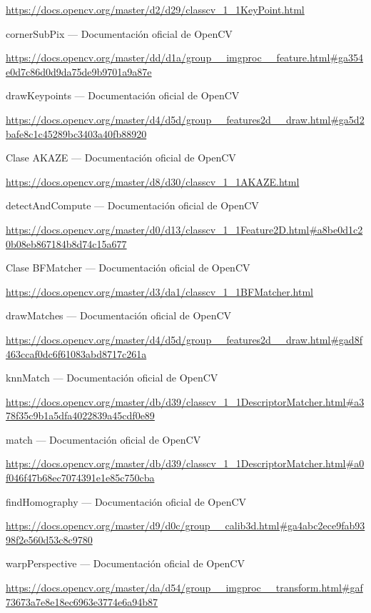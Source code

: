 \documentclass[12pt, spanish]{article}
\begin{document}
\begin{thebibliography}{9}
		\url{https://docs.opencv.org/master/d2/d29/classcv_1_1KeyPoint.html}


		cornerSubPix --- Documentación oficial de OpenCV

		\url{https://docs.opencv.org/master/dd/d1a/group__imgproc__feature.html#ga354e0d7c86d0d9da75de9b9701a9a87e}


		drawKeypoints --- Documentación oficial de OpenCV

		\url{https://docs.opencv.org/master/d4/d5d/group__features2d__draw.html#ga5d2bafe8c1c45289bc3403a40fb88920}


		Clase AKAZE --- Documentación oficial de OpenCV

		\url{https://docs.opencv.org/master/d8/d30/classcv_1_1AKAZE.html}


		detectAndCompute --- Documentación oficial de OpenCV

		\url{https://docs.opencv.org/master/d0/d13/classcv_1_1Feature2D.html#a8be0d1c20b08eb867184b8d74c15a677}


		Clase BFMatcher --- Documentación oficial de OpenCV

		\url{https://docs.opencv.org/master/d3/da1/classcv_1_1BFMatcher.html}


		drawMatches --- Documentación oficial de OpenCV

		\url{https://docs.opencv.org/master/d4/d5d/group__features2d__draw.html#gad8f463ccaf0dc6f61083abd8717c261a}


		knnMatch --- Documentación oficial de OpenCV

		\url{https://docs.opencv.org/master/db/d39/classcv_1_1DescriptorMatcher.html#a378f35c9b1a5dfa4022839a45cdf0e89}


		match --- Documentación oficial de OpenCV

		\url{https://docs.opencv.org/master/db/d39/classcv_1_1DescriptorMatcher.html#a0f046f47b68ec7074391e1e85c750cba}


		findHomography --- Documentación oficial de OpenCV

		\url{https://docs.opencv.org/master/d9/d0c/group__calib3d.html#ga4abc2ece9fab9398f2e560d53c8c9780}


		warpPerspective --- Documentación oficial de OpenCV

		\url{https://docs.opencv.org/master/da/d54/group__imgproc__transform.html#gaf73673a7e8e18ec6963e3774e6a94b87}

\end{thebibliography}
\end{document}
